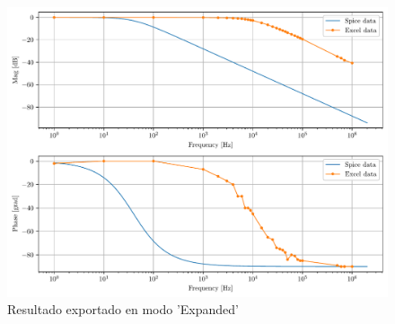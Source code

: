\begin{figure}[ht]
\centering
\includegraphics[scale=0.7]{resources/expExport.pdf}
\caption{Resultado exportado en modo 'Expanded'}
\label{fig:expExport}
\end{figure}
